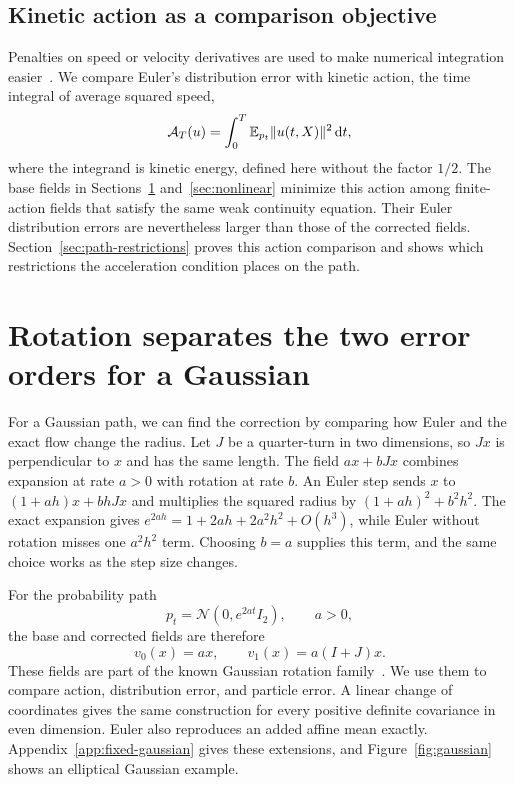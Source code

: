\subsection{Kinetic action as a comparison objective}

Penalties on speed or velocity derivatives are used to make numerical integration easier~\citep{finlay2020regularization,kelly2020easy,lee2023curvature}. We compare Euler's distribution error with kinetic action, the time integral of average squared speed,
\begin{equation}
 \mathcal A_T(u)=\int_0^T\mathbb E_{p_t}\|u(t,X)\|^2\,\mathrm d t,
 \label{eq:action}
\end{equation}
where the integrand is kinetic energy, defined here without the factor $1/2$. The base fields in Sections~\ref{sec:gaussian} and~\ref{sec:nonlinear} minimize this action among finite-action fields that satisfy the same weak continuity equation. Their Euler distribution errors are nevertheless larger than those of the corrected fields. Section~\ref{sec:path-restrictions} proves this action comparison and shows which restrictions the acceleration condition places on the path.


\section{Rotation separates the two error orders for a Gaussian}
\label{sec:gaussian}

For a Gaussian path, we can find the correction by comparing how Euler and the exact flow change the radius. Let $J$ be a quarter-turn in two dimensions, so $Jx$ is perpendicular to $x$ and has the same length. The field $ax+bJx$ combines expansion at rate $a>0$ with rotation at rate $b$. An Euler step sends $x$ to $(1+ah)x+bhJx$ and multiplies the squared radius by $(1+ah)^2+b^2h^2$. The exact expansion gives $e^{2ah}=1+2ah+2a^2h^2+O(h^3)$, while Euler without rotation misses one $a^2h^2$ term. Choosing $b=a$ supplies this term, and the same choice works as the step size changes.

For the probability path
\begin{equation}
 p_t=\mathcal N(0,e^{2at}I_2),\qquad a>0,
 \label{eq:gaussian-path}
\end{equation}
the base and corrected fields are therefore
\begin{equation}
 v_0(x)=ax,\qquad v_1(x)=a(I+J)x.
 \label{eq:fixed-fields}
\end{equation}
These fields are part of the known Gaussian rotation family~\citep{lim2025hidden}. We use them to compare action, distribution error, and particle error. A linear change of coordinates gives the same construction for every positive definite covariance in even dimension. Euler also reproduces an added affine mean exactly. Appendix~\ref{app:fixed-gaussian} gives these extensions, and Figure~\ref{fig:gaussian} shows an elliptical Gaussian example.

